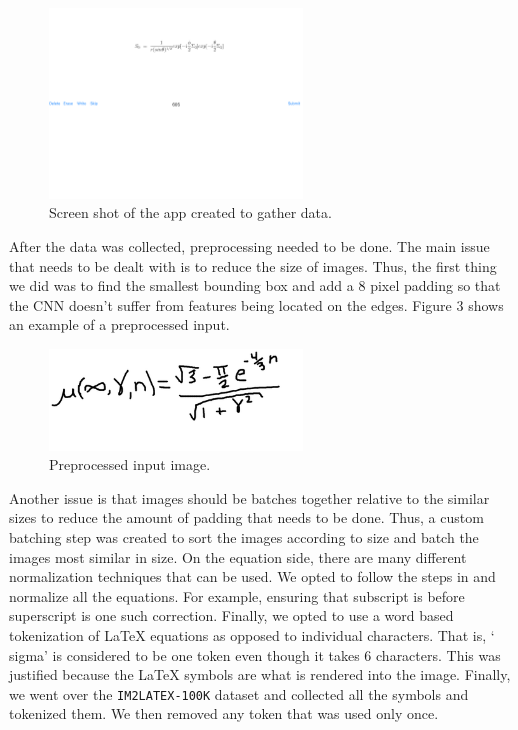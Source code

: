 \documentclass{article}
\begin{document}
\begin{figure}[h]
  \centering
  \includegraphics[width=0.6\textwidth]{ipad-app.png}
  \caption{Screen shot of the app created to gather data.}
\end{figure}

After the data was collected, preprocessing needed to be done. The main issue
that needs to be dealt with is to reduce the size of images. Thus, the first thing
we did was to find the smallest bounding box and add a 8 pixel padding so that the
CNN doesn't suffer from features being located on the edges. Figure 3 shows an example
of a preprocessed input.

\begin{figure}[h]
  \centering
  \includegraphics[width=0.6\textwidth]{example-input.png}
  \caption{Preprocessed input image.}
\end{figure}

Another issue is that images should be batches together relative to the similar sizes to
reduce the amount of padding that needs to be done. Thus, a custom batching step was created
to sort the images according to size and batch the images most similar in size. On the equation
side, there are many different normalization techniques that can be used. We opted
to follow the steps in \cite{1609.04938} and normalize all the equations. For example,
ensuring that subscript is before superscript is one such correction. Finally, we
opted to use a word based tokenization of \LaTeX{} equations as opposed to individual
characters. That is, `\\sigma' is considered to be one token even though it takes
6 characters. This was justified because the \LaTeX{} symbols are what is rendered
into the image. Finally, we went over the \texttt{IM2LATEX-100K} dataset and collected
all the symbols and tokenized them. We then removed any token that was used only once.
\end{document}
